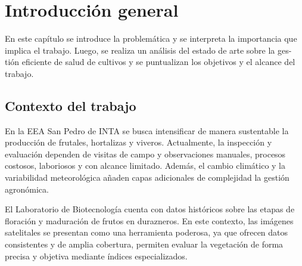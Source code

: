 
\chapter{Introducción general} %

\label{Chapter1} %
\label{IntroGeneral}

En este capítulo se introduce la problemática y se interpreta la importancia que
implica el trabajo. Luego, se realiza un análisis del estado de arte sobre la ges-
tión eficiente de salud de cultivos y se puntualizan los objetivos y el alcance del
trabajo.


\newcommand{\keyword}[1]{\textbf{#1}}
\newcommand{\tabhead}[1]{\textbf{#1}}
\newcommand{\code}[1]{\texttt{#1}}
\newcommand{\file}[1]{\texttt{\bfseries#1}}
\newcommand{\option}[1]{\texttt{\itshape#1}}
\newcommand{\grados}{$^{\circ}$}



\section{Contexto del trabajo}

En la EEA San Pedro de INTA se busca intensificar de manera sustentable la producción
de frutales, hortalizas y viveros. Actualmente, la inspección y evaluación
dependen de visitas de campo y observaciones manuales, procesos costosos, laboriosos
 y con alcance limitado. Además, el cambio climático y la variabilidad
meteorológica añaden capas adicionales de complejidad la gestión agronómica.

El Laboratorio de Biotecnología cuenta con datos históricos sobre las etapas de
floración y maduración de frutos en durazneros. En este contexto, las imágenes
satelitales se presentan como una herramienta poderosa, ya que ofrecen datos
consistentes y de amplia cobertura, permiten evaluar la vegetación de forma
precisa y objetiva mediante índices especializados.

